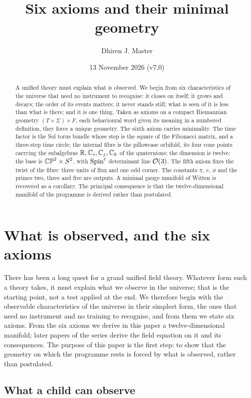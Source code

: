 \documentclass[11pt,a4paper]{article}
\title{Six axioms and their minimal geometry}
\author{Dhiren J. Master}
\date{13 November 2026 (v7.0)}
\theoremstyle{plain}
\theoremstyle{definition}
\theoremstyle{remark}
\begin{document}
\maketitle

\begin{abstract}
A unified theory must explain what is observed. We begin from six characteristics of the universe that need no instrument to recognise: it closes on itself; it grows and decays; the order of its events matters; it never stands still; what is seen of it is less than what is there; and it is one thing. Taken as axioms on a compact Riemannian geometry $(T\times\Sigma)\times F$, each behavioural word given its meaning in a numbered definition, they force a unique geometry. The sixth axiom carries minimality. The time factor is the Sol torus bundle whose step is the square of the Fibonacci matrix, and a three-step time circle; the internal fibre is the pillowcase orbifold, its four cone points carrying the subalgebras $\mathbb{R},\mathbb{C}_i,\mathbb{C}_j,\mathbb{C}_k$ of the quaternions; the dimension is twelve; the base is $\mathbb{CP}^2\times S^2$, with $\text{Spin}^c$ determinant line $\mathcal{O}(3)$. The fifth axiom fixes the twist of the fibre: three units of flux and one odd corner. The constants $\pi$, $e$, $\phi$ and the primes two, three and five are outputs. A minimal gauge manifold of Witten is recovered as a corollary. The principal consequence is that the twelve-dimensional manifold of the programme is derived rather than postulated.
\end{abstract}

\section{What is observed, and the six axioms}\label{sec:intro}

There has been a long quest for a grand unified field theory. Whatever form such a theory takes, it must explain what we observe in the universe; that is the starting point, not a test applied at the end. We therefore begin with the observable characteristics of the universe in their simplest form, the ones that need no instrument and no training to recognise, and from them we state six axioms. From the six axioms we derive in this paper a twelve-dimensional manifold; later papers of the series derive the field equation on it and its consequences. The purpose of this paper is the first step: to show that the geometry on which the programme rests is forced by what is observed, rather than postulated.

\subsection{What a child can observe}\label{sec:observe}
\end{document}
